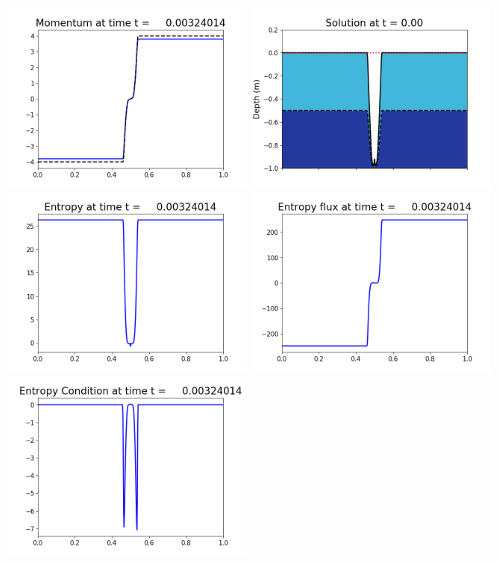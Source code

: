 \documentclass[11pt]{article}
\begin{document}
\vskip 10pt 
\includegraphics[width=0.475\textwidth]{frame0021fig1003.png}
\includegraphics[width=0.475\textwidth]{frame0021fig1006.png}
\vskip 10pt 
\includegraphics[width=0.475\textwidth]{frame0021fig1007.png}
\includegraphics[width=0.475\textwidth]{frame0021fig1008.png}
\vskip 10pt 
\includegraphics[width=0.475\textwidth]{frame0021fig1009.png}
\end{document}
